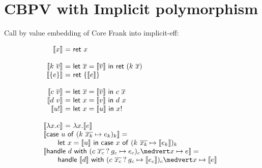 \documentclass[preprint]{sigplanconf}
\makeatletter
\newcommand{\many}{\overline}
\newcommand{\sem}[1]{\llbracket{#1}\rrbracket}
\newcommand\ba{\begin{array}}
\newcommand\ea{\end{array}}
\newenvironment{equations}{\[\ba{@{}r@{~}c@{~}l@{}}}{\ea\]}
\newcommand{\key}[1]{\mathsf{#1}}
\newcommand{\handleSymbol}{\mathbin{?}}
\newcommand{\handle}[2]{{#1} \handleSymbol {#2}}
\newcommand{\thunk}[1]{\{{#1}\}}
\newcommand{\force}[1]{{#1}!}
\makeatother
\begin{document}
\section{CBPV with Implicit polymorphism}

Call by value embedding of Core Frank into implicit-eff:

\begin{equations}
\sem{x} &=& \key{ret}~x \\
\\
\sem{k~\many{v}} &=& \key{let}~\many{x}=\sem{\many{v}} ~\key{in}~\key{ret}~(k~\many{x}) \\
\sem{\thunk{e}} &=& \key{ret}~\thunk{\sem{e}} \\
\\
\sem{c~\many{v}} &=& \key{let}~\many{x}=\sem{\many{v}} ~\key{in}~c~\many{x} \\
\sem{d~v} &=& \key{let}~x=\sem{v} ~\key{in}~d~x \\
\sem{\force{u}} &=& \key{let}~x=\sem{u} ~\key{in}~\force{x} \\
\\
\sem{\lambda x.e} &=& \lambda x.\sem{e} \\
\multicolumn{3}{@{}l}{\sem{\key{case}~u~\key{of}~(k~\many{x_k} \mapsto e_k)_k} =} \\
\multicolumn{3}{@{}l}
  {\qquad \key{let}~x=\sem{u} ~\key{in}~
    \key{case}~x~\key{of}~(k~\many{x_k} \mapsto \sem{e_k})_k} \\
\multicolumn{3}{@{}l}{\sem{\key{handle}~d~\key{with}~(\handle{c~\many{x_c}}{g_c} \mapsto e_c)_c \medvert x \mapsto e} =} \\
\multicolumn{3}{@{}l}
  {\qquad \key{handle}~\sem{d}~\key{with}~ 
            (\handle{c~\many{x_c}}{g_c} \mapsto \sem{e_c})_c
            \medvert x \mapsto \sem{e}} \\
\end{equations}
\end{document}
